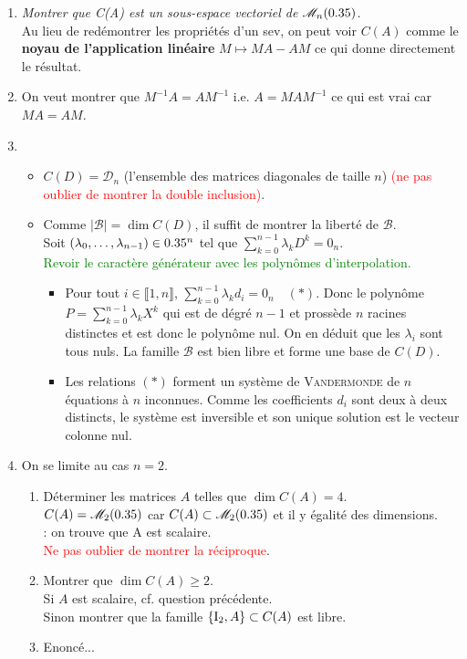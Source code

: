 \begin{enumerate}
    \item \emph{Montrer que C(A) est un sous-espace vectoriel de $\mathscr{M}_n(0.35)$.} \\
    Au lieu de redémontrer les propriétés d'un sev, on peut voir $C(A)$ comme le \textbf{noyau de l'application linéaire} $M \mapsto MA - AM$ ce qui donne directement le résultat. 
    \item On veut montrer que $M^{-1} A = A M^{-1}$ i.e. $A = M A M^{-1}$ ce qui est vrai car $M A = A M$.
    \item
    \begin{itemize}
        \item $C(D) = \mathscr{D}_n$ (l'ensemble des matrices diagonales de taille $n$) \textcolor{red}{(ne pas oublier de montrer la double inclusion)}.
        \item Comme $| \mathscr{B} | = \dim C(D)$, il suffit de montrer la liberté de $\mathscr{B}$. \\
        Soit $(\lambda_0, \dots, \lambda_{n-1}) \in 0.35^n$ tel que $\sum\limits_{k=0}^{n-1} \lambda_k D^k = 0_n$. \\
        \textcolor{green}{Revoir le caractère générateur avec les polynômes d'interpolation.}
        \begin{itemize}
            \item Pour tout $i \in \llbracket 1, n \rrbracket$, $\sum\limits_{k=0}^{n-1} \lambda_k d_i = 0_n \quad (*)$. Donc le polynôme $P = \sum\limits_{k=0}^{n-1} \lambda_k X^k$ qui est de dégré $n-1$ et prossède $n$ racines distinctes et est donc le polynôme nul. On en déduit que les $\lambda_i$ sont tous nuls. La famille $\mathscr{B}$ est bien libre et forme une base de $C(D)$.
            \item Les relations $(*)$ forment un système de \textsc{Vandermonde} de $n$ équations à $n$ inconnues. Comme les coefficients $d_i$ sont deux à deux distincts, le système est inversible et son unique solution est le vecteur colonne nul.
        \end{itemize}
    \end{itemize}
    \item On se limite au cas $n = 2$. 
    \begin{enumerate}
        \item Déterminer les matrices $A$ telles que $\dim C(A) = 4$. \\
        $C(A) = \mathscr{M}_2(0.35)$ car $C(A) \subset \mathscr{M}_2(0.35)$ et il y égalité des dimensions. \\
        : on trouve que A est scalaire. \\
        \textcolor{red}{Ne pas oublier de montrer la réciproque}. 
        \item Montrer que $\dim C(A) \geqslant 2$. \\
        Si $A$ est scalaire, cf. question précédente. \\
        Sinon montrer que la famille $\{ \mathrm{I}_2, A \} \subset C(A)$ est libre. 
        \item Enoncé... \\
    \end{enumerate}
\end{enumerate}